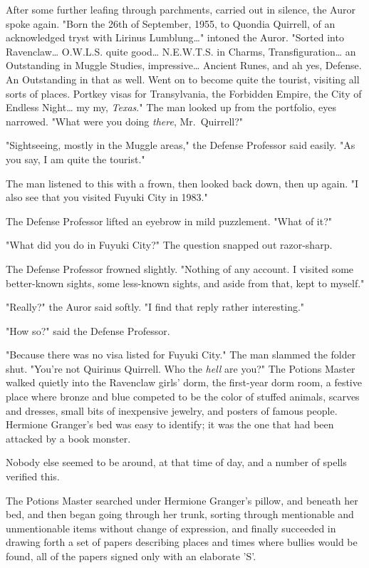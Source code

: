 After some further leafing through parchments, carried out in silence, the Auror spoke again. "Born the 26th of September, 1955, to Quondia Quirrell, of an acknowledged tryst with Lirinus Lumblung{\ldots}" intoned the Auror. "Sorted into Ravenclaw{\ldots} O.W.L.S. quite good{\ldots} N.E.W.T.S. in Charms, Transfiguration{\ldots} an Outstanding in Muggle Studies, impressive{\ldots} Ancient Runes, and ah yes, Defense. An Outstanding in that as well. Went on to become quite the tourist, visiting all sorts of places. Portkey visas for Transylvania, the Forbidden Empire, the City of Endless Night{\ldots} my my, \emph{Texas}." The man looked up from the portfolio, eyes narrowed. "What were you doing \emph{there}, Mr.~Quirrell?"

"Sightseeing, mostly in the Muggle areas," the Defense Professor said easily. "As you say, I am quite the tourist."

The man listened to this with a frown, then looked back down, then up again. "I also see that you visited Fuyuki City in 1983."

The Defense Professor lifted an eyebrow in mild puzzlement. "What of it?"

"What did you do in Fuyuki City?" The question snapped out razor-sharp.

The Defense Professor frowned slightly. "Nothing of any account. I visited some better-known sights, some less-known sights, and aside from that, kept to myself."

"Really?" the Auror said softly. "I find that reply rather interesting."

"How so?" said the Defense Professor.

"Because there was no visa listed for Fuyuki City." The man slammed the folder shut. "You're not Quirinus Quirrell. Who the \emph{hell} are you?"
\sbreak
The Potions Master walked quietly into the Ravenclaw girls' dorm, the first-year dorm room, a festive place where bronze and blue competed to be the color of stuffed animals, scarves and dresses, small bits of inexpensive jewelry, and posters of famous people. Hermione Granger's bed was easy to identify; it was the one that had been attacked by a book monster.

Nobody else seemed to be around, at that time of day, and a number of spells verified this.

The Potions Master searched under Hermione Granger's pillow, and beneath her bed, and then began going through her trunk, sorting through mentionable and unmentionable items without change of expression, and finally succeeded in drawing forth a set of papers describing places and times where bullies would be found, all of the papers signed only with an elaborate 'S'.


